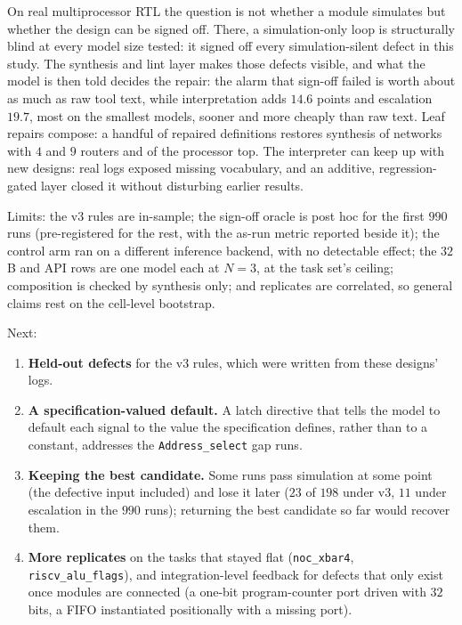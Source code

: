\documentclass[11pt]{article}
\begin{document}
On real multiprocessor RTL the question is not whether a module simulates but
whether the design can be signed off. There, a simulation-only loop is
structurally blind at every model size tested: it signed off every
simulation-silent defect in this study. The synthesis and lint layer makes
those defects visible, and what the model is then told decides the repair: the
alarm that sign-off failed is worth about as much as raw tool text, while
interpretation adds $14.6$ points and escalation $19.7$, most on the smallest
models, sooner and more cheaply than raw text. Leaf repairs compose: a handful
of repaired definitions restores synthesis of networks with $4$ and $9$
routers and of the processor top. The interpreter can keep up with new
designs: real logs exposed missing vocabulary, and an additive,
regression-gated layer closed it without disturbing earlier results.

Limits: the v3 rules are in-sample; the sign-off oracle is post hoc for the
first $990$ runs (pre-registered for the rest, with the as-run metric reported
beside it); the control arm ran on a different inference backend, with no
detectable effect; the $32$B and API rows are one model each at $N{=}3$, at the
task set's ceiling; composition is checked by synthesis only; and replicates
are correlated, so general claims rest on the cell-level bootstrap.

Next:
\begin{enumerate}[leftmargin=1.2em, itemsep=0.1em]
\item \textbf{Held-out defects} for the v3 rules, which were written from
these designs' logs.
\item \textbf{A specification-valued default.} A latch directive that tells the
model to default each signal to the value the specification defines, rather
than to a constant, addresses the \texttt{Address\_select} gap runs.
\item \textbf{Keeping the best candidate.} Some runs pass simulation at some
point (the defective input included) and lose it later ($23$ of $198$ under
v3, $11$ under escalation in the $990$ runs); returning the best candidate so
far would recover them.
\item \textbf{More replicates} on the tasks that stayed flat
(\texttt{noc\_xbar4}, \texttt{riscv\_alu\_flags}), and integration-level
feedback for defects that only exist once modules are connected (a one-bit
program-counter port driven with $32$ bits, a FIFO instantiated positionally
with a missing port).
\end{enumerate}
\end{document}
